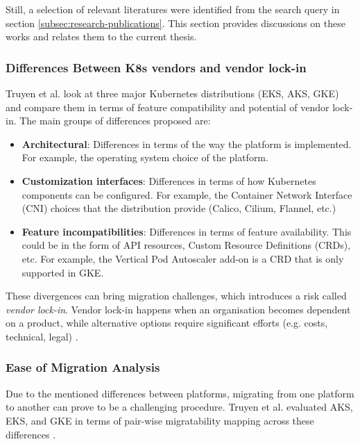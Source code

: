 Still, a selection of relevant literatures were identified from the search query in section \ref{subsec:research-publications}. This section provides discussions on these works and relates them to the current thesis.

\subsubsection{Differences Between K8s vendors and vendor lock-in}
Truyen et al. \cite{truyenManagingFeatureCompatibility2020} look at three major Kubernetes distributions (EKS, AKS, GKE) and compare them in terms of feature compatibility and potential of vendor lock-in. The main groups of differences proposed are:

\begin{itemize}

\item \textbf{Architectural}: Differences in terms of the way the platform is implemented. For example, the operating system choice of the platform.
\item \textbf{Customization interfaces}: Differences in terms of how Kubernetes components can be configured. For example, the Container Network Interface (CNI) choices that the distribution provide (Calico, Cilium, Flannel, etc.)
\item \textbf{Feature incompatibilities}: Differences in terms of feature availability. This could be in the form of API resources, Custom Resource Definitions (CRDs), etc. For example, the Vertical Pod Autoscaler add-on is a CRD that is only supported in GKE.

\end{itemize}

These divergences can bring migration challenges, which introduces a risk called \textit{vendor lock-in}. Vendor lock-in happens when an organisation becomes dependent on a product, while alternative options require significant efforts (e.g. costs, technical, legal) \cite{opara2016critical}.



\subsubsection{Ease of Migration Analysis}

Due to the mentioned differences between platforms, migrating from one platform to another can prove to be a challenging procedure. Truyen et al. \cite{truyenManagingFeatureCompatibility2020} evaluated AKS, EKS, and GKE in terms of pair-wise migratability mapping across these differences \cite{truyenManagingFeatureCompatibility2020}. 

